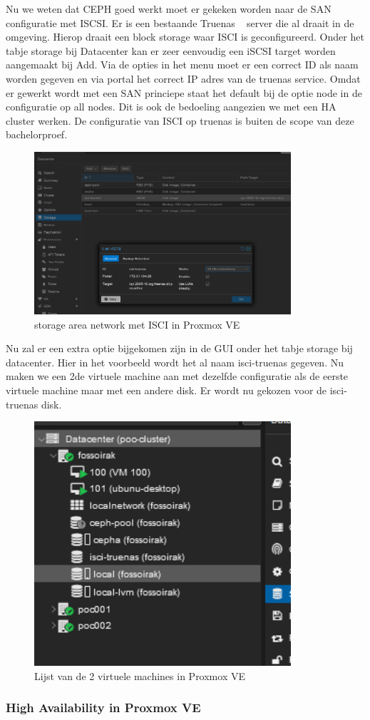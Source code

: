 Nu we weten dat CEPH goed werkt moet er gekeken worden naar de SAN configuratie met ISCSI.
Er is een bestaande Truenas ~\autocite{truenas} server die al draait in de omgeving. Hierop draait een block storage waar ISCI is geconfigureerd.
Onder het tabje storage  bij Datacenter kan er zeer eenvoudig een iSCSI target worden aangemaakt bij Add.
Via de opties in het menu moet er een correct ID als naam worden gegeven en via portal het correct IP adres van de truenas service.
Omdat er gewerkt wordt met een SAN princiepe staat het default bij de optie node in de configuratie op all nodes. Dit is ook de bedoeling aangezien we met een HA cluster werken.
De configuratie van ISCI op truenas is buiten de scope van deze bachelorproef.
\begin{figure}[H]
  \centering
  \includegraphics[width=0.85\textwidth]{../poc/iscsi-prox.png}
  \caption{storage area network met ISCI in Proxmox VE}
  \label{fig:iscsi-SAN}
\end{figure}
Nu zal er een extra  optie bijgekomen zijn in de GUI onder het tabje storage bij datacenter. Hier in het voorbeeld wordt het al naam isci-truenas gegeven.
Nu maken we een 2de virtuele machine aan met dezelfde configuratie als de eerste virtuele machine maar met een andere disk. Er wordt nu gekozen voor de isci-truenas disk.
\begin{figure}[H]
  \centering
  \includegraphics[width=0.85\textwidth]{../poc/vm-lijst-prox.png}
  \caption{Lijst van de 2 virtuele machines in Proxmox VE}
  \label{fig:vm-lijst}
\end{figure}

\subsubsection{High Availability in Proxmox VE}
